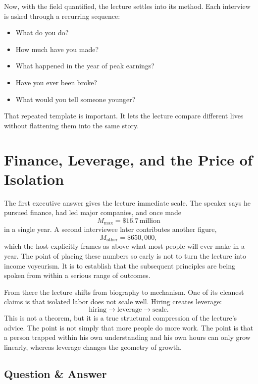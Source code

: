 Now, with the field quantified, the lecture settles into its method. Each interview is asked through a recurring sequence:
\begin{itemize}
\item What do you do?
\item How much have you made?
\item What happened in the year of peak earnings?
\item Have you ever been broke?
\item What would you tell someone younger?
\end{itemize}
That repeated template is important. It lets the lecture compare different lives without flattening them into the same story.

\section{Finance, Leverage, and the Price of Isolation}

The first executive answer gives the lecture immediate scale. The speaker says he pursued finance, had led major companies, and once made
\begin{equation}
M_{\max}=\$16.7\,\text{million}
\end{equation}
in a single year. A second interviewee later contributes another figure,
\begin{equation}
M_{\text{other}}=\$650{,}000,
\end{equation}
which the host explicitly frames as above what most people will ever make in a year. The point of placing these numbers so early is not to turn the lecture into income voyeurism. It is to establish that the subsequent principles are being spoken from within a serious range of outcomes.

From there the lecture shifts from biography to mechanism. One of its cleanest claims is that isolated labor does not scale well. Hiring creates leverage:
\begin{equation}
\text{hiring} \rightarrow \text{leverage} \rightarrow \text{scale}.
\end{equation}
This is not a theorem, but it is a true structural compression of the lecture's advice. The point is not simply that more people do more work. The point is that a person trapped within his own understanding and his own hours can only grow linearly, whereas leverage changes the geometry of growth.

\subsection{Question \& Answer}

